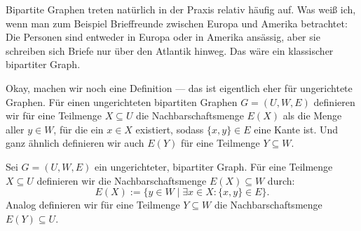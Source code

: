 \begin{spoken-clean}[00:56:41 - 00:59:04]
Bipartite Graphen treten natürlich in der Praxis relativ häufig auf. Was weiß ich, wenn man zum Beispiel Brieffreunde zwischen Europa und Amerika betrachtet: Die Personen sind entweder in Europa oder in Amerika ansässig, aber sie schreiben sich Briefe nur über den Atlantik hinweg. Das wäre ein klassischer bipartiter Graph.

Okay, machen wir noch eine Definition --- das ist eigentlich eher für ungerichtete Graphen. Für einen ungerichteten bipartiten Graphen $G = (U, W, E)$ definieren wir für eine Teilmenge $X \subseteq U$ die Nachbarschaftsmenge $E(X)$ als die Menge aller $y \in W$, für die ein $x \in X$ existiert, sodass $\{x, y\} \in E$ eine Kante ist. Und ganz ähnlich definieren wir auch $E(Y)$ für eine Teilmenge $Y \subseteq W$.
\end{spoken-clean}

\begin{math-stroke}
\begin{definition}[Nachbarschaftsmenge]\label{def:nachbarschaftsmenge}
Sei $G = (U, W, E)$ ein ungerichteter, bipartiter Graph. Für eine Teilmenge $X \subseteq U$ definieren wir die Nachbarschaftsmenge $E(X) \subseteq W$ durch:
\[
E(X) := \{ y \in W \mid \exists x \in X \colon \{x, y\} \in E \}.
\]
Analog definieren wir für eine Teilmenge $Y \subseteq W$ die Nachbarschaftsmenge $E(Y) \subseteq U$.
\end{definition}
\end{math-stroke}

